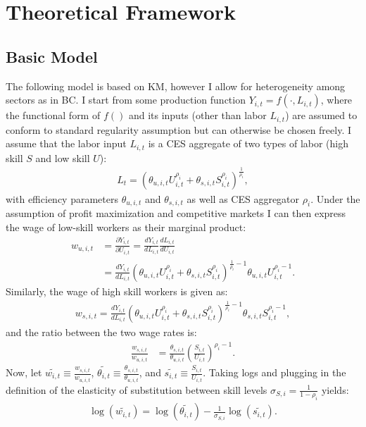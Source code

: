 \documentclass[]{article}
\begin{document}
\section{Theoretical Framework}
\label{sec:theory}

\subsection{Basic Model}

The following model is based on KM, however I allow for heterogeneity
among sectors as in BC.  I start from some production function
$Y_{i,t}=f(\cdot,L_{i,t})$, where the functional form of $f()$ and its
inputs (other than labor $L_{i,t}$) are assumed to conform to standard
regularity assumption but can otherwise be chosen freely. I assume
that the labor input $L_{i,t}$ is a CES aggregate of two types of
labor (high skill $S$ and low skill $U$):
\begin{align}
  \label{eq:ces}
  L_{t}=\left( \theta_{u,i,t}U_{i,t}^{\rho_{i}} + \theta_{s,i,t}S_{i,t}^{\rho_{i}} \right)^{\frac{1}{\rho_{i}}},
\end{align}
with efficiency parameters $\theta_{u,i,t}$ and $\theta_{s,i,t}$ as
well as CES aggregator $\rho_{i}$. Under the assumption of profit
maximization and competitive markets I can then express the wage of
low-skill workers as their marginal product:
\begin{align}
  \label{eq:wage1}
  w_{u,i,t}&=\frac{\partial Y_{i,t}}{\partial U_{i,t}}=\frac{d
             Y_{i,t}}{d L_{i,t}}\frac{d L_{i,t}}{d U_{i,t}} \\
           & = \frac{d Y_{i,t}}{d L_{i,t}} \left(
             \theta_{u,i,t}U_{i,t}^{\rho_{i}} + \theta_{s,i,t}S_{i,t}^{\rho_{i}}
             \right)^{\frac{1}{\rho_{i}}-1}  \theta_{u,i,t}
             U_{i,t}^{\rho_{i}-1}.
\end{align}
Similarly, the wage of high skill workers is given as:
\begin{align}
  \label{eq:wage2}
  w_{s,i,t} = \frac{d Y_{i,t}}{d L_{i,t}} \left(
  \theta_{u,i,t}U_{i,t}^{\rho_{i}} + \theta_{s,i,t}S_{i,t}^{\rho_{i}}
  \right)^{\frac{1}{\rho_{i}}-1} 
  \theta_{s,i,t}S_{i,t}^{\rho_{i}-1},
\end{align}
and the ratio between the two wage rates is:
\begin{align}
  \label{eq:wageratio}
  \frac{w_{s,i,t}}{w_{u,i,t}}&= \frac{\theta_{s,i,t}}{\theta_{u,i,t}}\left( \frac{S_{i,t}}{U_{i,t}} \right)^{\rho_{i}-1}.
\end{align}
Now, let $\widetilde{w_{i,t}}\equiv \frac{w_{s,i,t}}{w_{u,i,t}}$,
$\widetilde{\theta_{i,t}}\equiv
\frac{\theta_{s,i,t}}{\theta_{u,i,t}}$, and
$\widetilde{s_{i,t}}\equiv \frac{S_{i,t}}{U_{i,t}}$. Taking logs and
plugging in the definition of the elasticity of substitution between
skill levels $\sigma_{S,i}=\frac{1}{1-\rho_{i}}$ yields:
\begin{align}
  \label{eq:esteq1}
  \log(\widetilde{w_{i,t}}) = \log(\widetilde{\theta_{i,t}}) - \frac{1}{\sigma_{S,i}}\log(\widetilde{s_{i,t}}).
\end{align}
\end{document}
